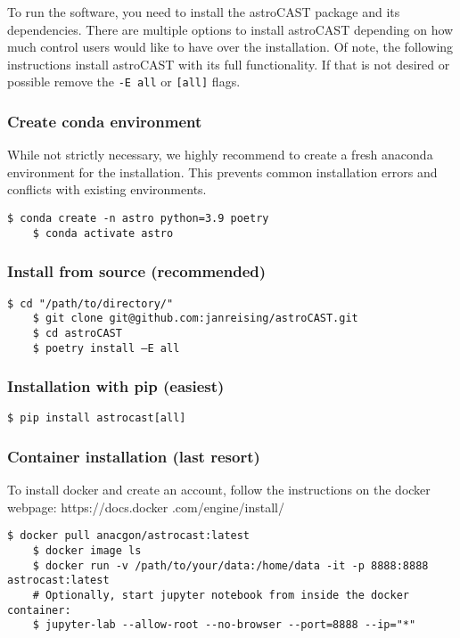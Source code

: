 To run the software, you need to install the astroCAST package and its dependencies. There are multiple options to
install \ac{astroCAST} depending on how much control users would like to have over the installation. Of note, the
following instructions install astroCAST with its full functionality. If that is not desired or possible remove the \lstinline[style=bashStyle]{-E all} or \lstinline[style=bashStyle]{[all]} flags.

\subsubsection{Create conda environment}
While not strictly necessary, we highly recommend to create a fresh anaconda environment for the installation. This
prevents common installation errors and conflicts with existing environments.

\begin{lstlisting}[style=bashStyle]
    $ conda create -n astro python=3.9 poetry
    $ conda activate astro
\end{lstlisting}

\subsubsection{Install from source (recommended)}
\label{res:install-from-source}
\begin{lstlisting}[style=bashStyle]
    $ cd "/path/to/directory/"
    $ git clone git@github.com:janreising/astroCAST.git
    $ cd astroCAST
    $ poetry install –E all
\end{lstlisting}

\subsubsection{Installation with pip (easiest)}
\begin{lstlisting}[style=bashStyle]
    $ pip install astrocast[all]
\end{lstlisting}

\subsubsection{Container installation (last resort)}

To install docker and create an account, follow the instructions on the docker webpage: https://docs.docker
.com/engine/install/

\begin{lstlisting}[style=bashStyle]
    $ docker pull anacgon/astrocast:latest
    $ docker image ls
    $ docker run -v /path/to/your/data:/home/data -it -p 8888:8888 astrocast:latest
    # Optionally, start jupyter notebook from inside the docker container:
    $ jupyter-lab --allow-root --no-browser --port=8888 --ip="*"
\end{lstlisting}

